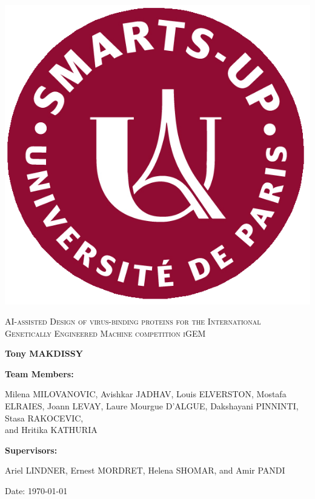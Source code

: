 \documentclass[11pt,a4paper]{article}
\begin{document}
\begin{titlepage}
\begin{minipage}{0.25\textwidth}
        \includegraphics[width=\linewidth]{Logos/SmartUP_1920-1 (1).png}\par\vspace{1cm}
    \end{minipage}

    {\scshape\Large AI-assisted Design of virus-binding proteins for the International
    Genetically Engineered Machine competition iGEM \par}
    \vspace{1cm}

    {\huge\bfseries Tony MAKDISSY \par}
    \vspace{1.5cm}

    \textbf{Team Members:}
    
    Milena MILOVANOVIC, Avishkar JADHAV, Louis ELVERSTON, Mostafa ELRAIES, Joann LEVAY, Laure Mourgue D'ALGUE, Dakshayani PINNINTI, Stasa RAKOCEVIC, \\ and Hritika KATHURIA
    \vspace{0.5cm}
    
    \textbf{Supervisors:}

    Ariel LINDNER, Ernest MORDRET, Helena SHOMAR, and Amir PANDI

    \vfill

    {\large Date: \today\par}
\end{titlepage}
\end{document}

